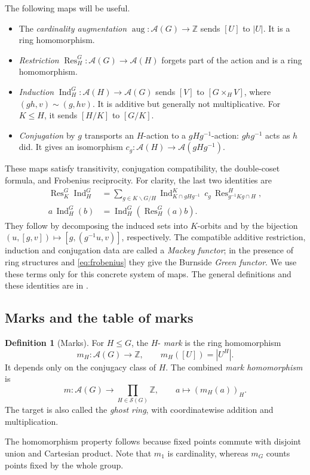 \documentclass[11pt,a4paper]{article}
\newcommand{\defn}[1]{\textsl{\color{darkblue} #1}}
\numberwithin{equation}{section}
\theoremstyle{definition}
\newtheorem{definition}[theorem]{Definition}
\theoremstyle{remark}
\newcommand{\Z}{\mathbb Z}
\newcommand{\G}{G}
\newcommand{\Res}{\operatorname{Res}}
\newcommand{\Ind}{\operatorname{Ind}}
\newcommand{\Burn}{\mathcal A}
\begin{document}
The following maps will be useful.
\begin{itemize}
\item The \defn{cardinality augmentation}
$\operatorname{aug}:\Burn(\G)\to\Z$ sends $[U]$ to $|U|$.
It is a ring homomorphism.
\item \defn{Restriction} $\Res_H^\G:\Burn(\G)\to\Burn(H)$ forgets
part of the action and is a ring homomorphism.
\item \defn{Induction} $\Ind_H^\G:\Burn(H)\to\Burn(\G)$ sends
$[V]$ to $[\G\times_H V]$, where
$(gh,v)\sim(g,hv)$.  It is additive but generally not multiplicative.
For $K\leq H$, it sends $[H/K]$ to $[\G/K]$.
\item \defn{Conjugation} by $g$ transports an $H$-action to a
$gHg^{-1}$-action: $ghg^{-1}$ acts as $h$ did.  It gives an isomorphism
$c_g:\Burn(H)\to\Burn(gHg^{-1})$.
\end{itemize}
These maps satisfy transitivity, conjugation compatibility, the
double-coset formula, and Frobenius reciprocity.  For clarity, the
last two identities are
\begin{align}
 \Res_K^\G\Ind_H^\G
 &=\sum_{g\in K\backslash\G/H}
   \Ind_{K\cap gHg^{-1}}^K\,c_g\,
   \Res_{g^{-1}Kg\cap H}^{H},\label{eq:mackey}\\
 a\,\Ind_H^\G(b)&=\Ind_H^\G(\Res_H^\G(a)b).
       \label{eq:frobenius}
\end{align}
They follow by decomposing the induced sets into $K$-orbits and by
the bijection $(u,[g,v])\mapsto[g,(g^{-1}u,v)]$, respectively.
The compatible additive restriction, induction and conjugation data
are called a \defn{Mackey functor}; in the presence of ring structures
and \eqref{eq:frobenius} they give the Burnside \defn{Green functor}.
We use these terms only for this concrete system of maps.  The
general definitions and these identities are in
\cite[\S2.2, Proposition 3.1.3, \S5]{Bouc}.

\subsection{Marks and the table of marks}

\begin{definition}[Marks]
For $H\leq\G$, the $H$-\defn{mark} is the ring homomorphism
\[
 m_H:\Burn(\G)\longrightarrow\Z,
 \qquad m_H([U])=|U^H|.
\]
It depends only on the conjugacy class of $H$.  The combined
\defn{mark homomorphism} is
\begin{equation}\label{eq:marks}
 m:\Burn(\G)\longrightarrow\prod_{H\in\mathscr S(\G)}\Z,
 \qquad a\longmapsto(m_H(a))_H.
\end{equation}
The target is also called the \defn{ghost ring}, with coordinatewise
addition and multiplication.
\end{definition}
The homomorphism property follows because fixed points commute with
disjoint union and Cartesian product.  Note that $m_1$ is cardinality,
whereas $m_\G$ counts points fixed by the whole group.
\end{document}

